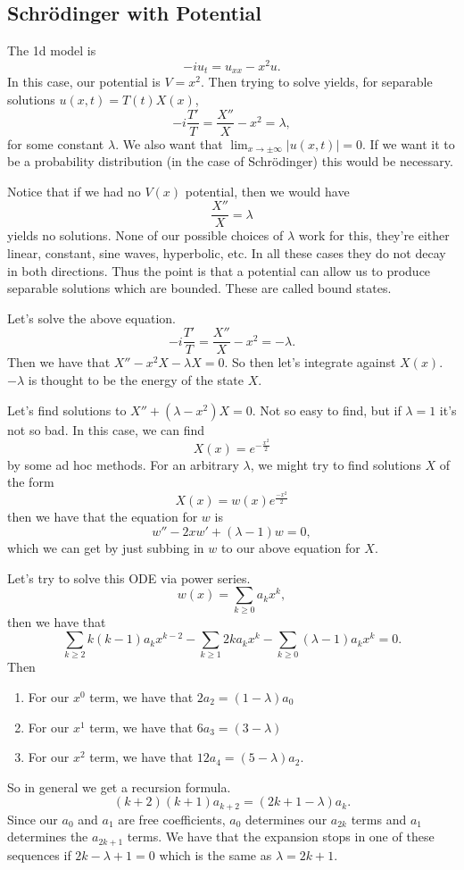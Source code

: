 \subsection{Schr\"odinger with Potential}
The 1d model is
\[ -i u_{t} = u_{x x} - x^{2} u. \]
In this case, our potential is \( V = x^{2} \). Then trying to solve yields, for separable solutions \( u(x, t) = T(t)X(x) \),
\[ -i \frac{T'}{T} = \frac{X''}{X} - x^{2} = \lambda, \]
for some constant \( \lambda \). We also want that \( \lim_{x \to \pm \infty} |u(x, t)| = 0 \). If we want it to be a probability distribution (in the case of Schr\"odinger) this would be necessary.

Notice that if we had no \( V(x) \) potential, then we would have 
\[ \frac{X''}{X} = \lambda \]
yields no solutions. None of our possible choices of \( \lambda \) work for this, they're either linear, constant, sine waves, hyperbolic, etc. In all these cases they do not decay in both directions. Thus the point is that a potential can allow us to produce separable solutions which are bounded. These are called bound states.

Let's solve the above equation.
\[ - i \frac{T'}{T} = \frac{X''}{X} - x^{2} = -\lambda. \]
Then we have that \( X'' - x^{2} X - \lambda X = 0 \). So then let's integrate against \( X(x) \). \( -\lambda \) is thought to be the energy of the state \( X \).

Let's find solutions to \( X'' + (\lambda - x^{2}) X = 0 \). Not so easy to find, but if \( \lambda = 1 \) it's not so bad. In this case, we can find
\[ X(x) = e^{- \frac{x^{2}}{2}} \]
by some ad hoc methods. For an arbitrary \( \lambda \), we might try to find solutions \( X \) of the form
\[ X(x) = w(x) e^{\frac{-x^{2}}{2}} \]
then we have that the equation for \( w \) is
\[ w'' - 2x w' + (\lambda - 1) w = 0, \]
which we can get by just subbing in \( w \) to our above equation for \( X \).

Let's try to solve this ODE via power series.
\[ w(x) = \sum_{k \ge 0} a_{k} x^{k}, \]
then we have that
\[ \sum_{k \ge 2} k (k-1)a_{k}x^{k-2} - \sum_{k\ge 1}2k a_{k}x^{k} - \sum_{k \ge 0} (\lambda - 1) a_{k}x^{k} = 0.   \]
Then
\begin{enumerate}

	\item For our \( x^{0} \) term, we have that \( 2 a_{2} = \left( 1 - \lambda \right) a_{0} \)
	\item For our \( x^{1} \) term, we have that \( 6a_{3} = \left( 3 - \lambda \right) \)
	\item For our \( x^{2} \) term, we have that \( 12 a_{4} = (5 - \lambda) a_{2} \).
\end{enumerate}
So in general we get a recursion formula.
\[ (k+2)(k+1) a_{k+2} = (2k + 1- \lambda) a_{k}. \]
Since our \( a_{0} \) and \( a_{1} \) are free coefficients, \( a_{0} \) determines our \( a_{2k} \) terms and \( a_{1} \) determines the \( a_{2k+1} \) terms. We have that the expansion stops in one of these sequences if \( 2k - \lambda + 1 = 0 \) which is the same as \( \lambda = 2k+1 \).


